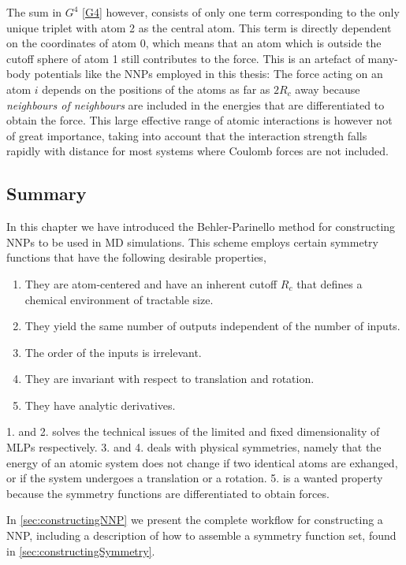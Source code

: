 \documentclass[twoside,english]{uiofysmaster}
\begin{document}
The sum in $G^4$ \eqref{G4} however, consists of only one term corresponding to the only unique triplet with atom 2
as the central atom. This term is directly dependent on the coordinates of atom 0, which means that 
an atom which is outside the cutoff sphere of atom 1 still contributes to the force. This is an artefact of many-body potentials
like the NNPs employed in this thesis: The force acting on an atom $i$ depends on the positions of the atoms as 
far as $2R_c$ away because \textit{neighbours of neighbours} are included in the
energies that are differentiated to obtain the force. 
This large effective range of atomic interactions is however not of great importance, taking into account
that the interaction strength falls rapidly with distance for most systems where Coulomb forces are not included. 


\subsection{Summary}
In this chapter we have introduced the Behler-Parinello method for constructing NNPs to be used in MD simulations. 
This scheme employs certain symmetry functions that have the following desirable properties,
\begin{enumerate}
 \item They are atom-centered and have an inherent cutoff $R_c$ that defines a chemical environment of tractable size. 
 \item They yield the same number of outputs independent of the number of inputs. 
 \item The order of the inputs is irrelevant. 
 \item They are invariant with respect to translation and rotation.
 \item They have analytic derivatives.
\end{enumerate}
1. and 2. solves the technical issues of the limited and fixed dimensionality of MLPs respectively.
3. and 4. deals with physical symmetries, namely that the energy of an atomic system does not change
if two identical atoms are exhanged, or if the system undergoes a translation or a rotation. 
5. is a wanted property because the symmetry functions are differentiated to obtain forces. 

In \autoref{sec:constructingNNP} we present the complete workflow for constructing a NNP, 
including a description of how to assemble a symmetry function set, found in 
\autoref{sec:constructingSymmetry}.
\end{document}
